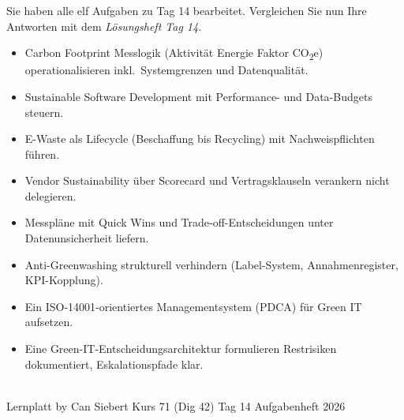 \documentclass[11pt,a4paper,oneside]{article}
\begin{document}
\noindent Sie haben alle elf Aufgaben zu Tag 14 bearbeitet. Vergleichen Sie nun Ihre Antworten mit dem \emph{L\"osungsheft Tag 14}.

\medskip
\begin{infobox}
\begin{itemize}
  \item Carbon Footprint Messlogik (Aktivit\"at \textrightarrow{} Energie \textrightarrow{} Faktor \textrightarrow{} CO\textsubscript{2}e) operationalisieren \textendash{} inkl.\ Systemgrenzen und Datenqualit\"at.
  \item Sustainable Software Development mit Performance- und Data-Budgets steuern.
  \item E-Waste als Lifecycle (Beschaffung bis Recycling) mit Nachweispflichten f\"uhren.
  \item Vendor Sustainability \"uber Scorecard und Vertragsklauseln verankern \textendash{} nicht delegieren.
  \item Messpl\"ane mit Quick Wins und Trade-off-Entscheidungen unter Datenunsicherheit liefern.
  \item Anti-Greenwashing strukturell verhindern (Label-System, Annahmenregister, KPI-Kopplung).
  \item Ein ISO-14001-orientiertes Managementsystem (PDCA) f\"ur Green IT aufsetzen.
  \item Eine Green-IT-Entscheidungsarchitektur formulieren \textendash{} Restrisiken dokumentiert, Eskalationspfade klar.
\end{itemize}
\end{infobox}

\vspace{1cm}
\noindent{\color{lpAccent}\rule{\linewidth}{0.6pt}}\\[4pt]
{\footnotesize\sffamily\color{lpGray}Lernplatt \textperiodcentered{} by Can Siebert \textperiodcentered{} Kurs 71 (Dig 42) \textperiodcentered{} Tag 14 \textperiodcentered{} Aufgabenheft \textperiodcentered{} \textcopyright{} 2026}
\end{document}

